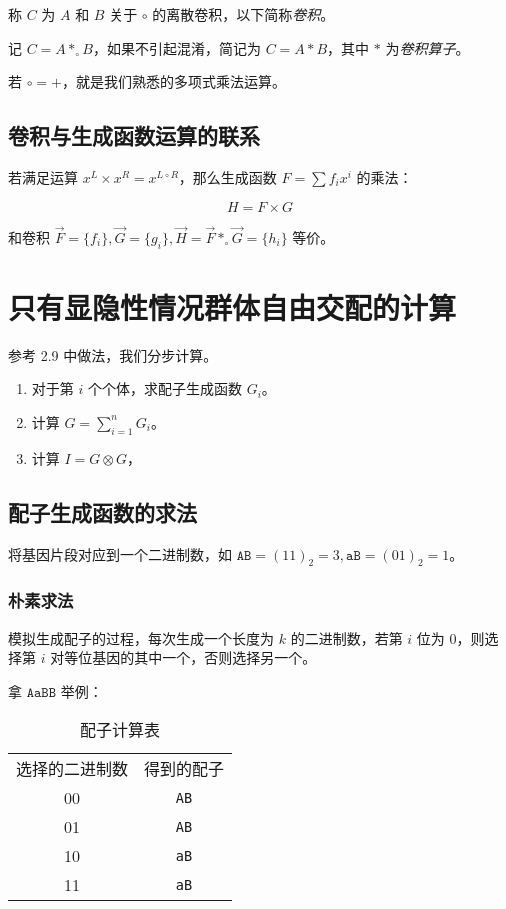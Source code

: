 \documentclass{article}
\begin{document}
称 $C$ 为 $A$ 和 $B$ 关于 $\circ$ 的离散卷积，以下简称\textsl{卷积}。

记 $C=A*_{\circ}B$，如果不引起混淆，简记为 $C=A*B$，其中 $*$ 为\textsl{卷积算子}。

若 $\circ = +$，就是我们熟悉的多项式乘法运算。

\subsection{卷积与生成函数运算的联系}

若满足运算 $x^L \times x^R = x^{L \circ R}$，那么生成函数 $F=\sum f_i x^i$ 的乘法：

$$H=F \times G$$

和卷积 $\vec F=\{f_i\},\vec G=\{g_i\},\vec H=\vec F *_{\circ} \vec G=\{h_i\}$ 等价。

\section{只有显隐性情况群体自由交配的计算}

参考 2.9 中做法，我们分步计算。

\begin{enumerate}
    \item 对于第 $i$ 个个体，求配子生成函数 $G_i$。
    \item 计算 $G=\sum_{i=1}^n G_i$。 
    \item 计算 $I=G \otimes G$，
\end{enumerate}

\subsection{配子生成函数的求法}

将基因片段对应到一个二进制数，如 $\texttt{AB}=(11)_2=3,\texttt{aB}=(01)_2=1$。

\subsubsection*{朴素求法}

模拟生成配子的过程，每次生成一个长度为 $k$ 的二进制数，若第 $i$ 位为 $0$，则选择第 $i$ 对等位基因的其中一个，否则选择另一个。

拿 $\texttt{AaBB}$ 举例：

\begin{table}[htbp]
    \centering
    \caption{配子计算表}
    \begin{tabular}{|c|c|}
        选择的二进制数 & 得到的配子 \\
        00 & \texttt{AB} \\
        01 & \texttt{AB} \\
        10 & \texttt{aB} \\
        11 & \texttt{aB} \\
    \end{tabular}
\end{table}
\end{document}
